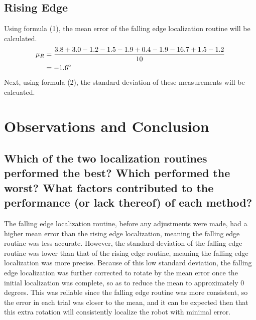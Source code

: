 \documentclass[11pt]{article}
\begin{document}
\subsection{Rising Edge}
Using formula (1), the mean error of the falling edge localization routine will be calculated.
\begin{equation*}
	\begin{aligned}
		\mu_R &= \dfrac{3.8+3.0-1.2-1.5-1.9+0.4-1.9-16.7+1.5-1.2}{10} \\
		&= -1.6 \degree
	\end{aligned}
\end{equation*}
Next, using formula (2), the standard deviation of these measurements will be calcuated.\\
\section{Observations and Conclusion}
\subsection{Which of the two localization routines performed the best? Which performed the worst?
What factors contributed to the performance (or lack thereof) of each method?}
\par The falling edge localization routine, before any adjustments were made, had a higher mean error
than the rising edge localization, meaning the falling edge routine was less accurate. However, the
standard deviation of the falling edge routine was lower than that of the rising edge routine,
meaning the falling edge localization was more precise. Because of this low standard deviation, the
falling edge localization was further corrected to rotate by the mean error once the initial
localization was complete, so as to reduce the mean to approximately 0 degrees. This was reliable
since the falling edge routine was more consistent, so the error in each trial was closer to the
mean, and it can be expected then that this extra rotation will consistently localize the robot with
minimal error. \\
\end{document}
